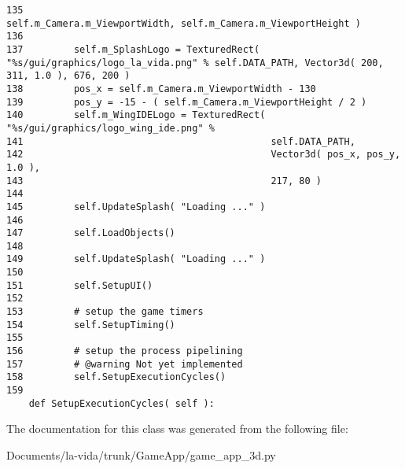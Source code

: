 \begin{Code}
\begin{verbatim}
135                                        self.m_Camera.m_ViewportWidth, self.m_Camera.m_ViewportHeight )
136 
137         self.m_SplashLogo = TexturedRect( "%s/gui/graphics/logo_la_vida.png" % self.DATA_PATH, Vector3d( 200, 311, 1.0 ), 676, 200 )
138         pos_x = self.m_Camera.m_ViewportWidth - 130
139         pos_y = -15 - ( self.m_Camera.m_ViewportHeight / 2 )
140         self.m_WingIDELogo = TexturedRect( "%s/gui/graphics/logo_wing_ide.png" % 
141                                            self.DATA_PATH, 
142                                            Vector3d( pos_x, pos_y, 1.0 ),
143                                            217, 80 )
144         
145         self.UpdateSplash( "Loading ..." )
146 
147         self.LoadObjects()
148         
149         self.UpdateSplash( "Loading ..." )
150         
151         self.SetupUI()
152         
153         # setup the game timers
154         self.SetupTiming()
155         
156         # setup the process pipelining
157         # @warning Not yet implemented
158         self.SetupExecutionCycles()
159         
    def SetupExecutionCycles( self ):
\end{verbatim}
\end{Code}




The documentation for this class was generated from the following file:\begin{CompactItemize}
\item 
Documents/la-vida/trunk/GameApp/game\_\-app\_\-3d.py\end{CompactItemize}
